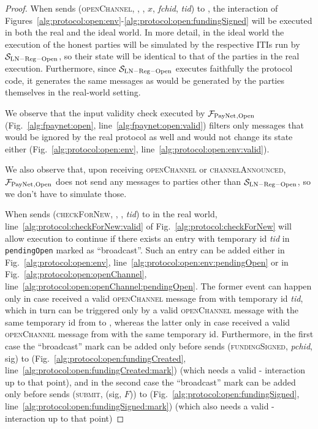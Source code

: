\begin{proof}
  When \environment{} sends (\textsc{openChannel}, \alice, \bob, $x$,
  \textit{fchid}, \textit{tid}) to \alice, the interaction of
  Figures~\ref{alg:protocol:open:env}-\ref{alg:protocol:open:fundingSigned}
  will be executed in both the real and the ideal world. In more detail, in
  the ideal world the execution of the honest parties will be simulated by the
  respective ITIs run by $\mathcal{S}_{\mathrm{LN - Reg - Open}}$, so their
  state will be identical to that of the parties in the real execution.
  Furthermore, since $\mathcal{S}_{\mathrm{LN - Reg - Open}}$ executes
  faithfully the protocol code, it generates the same messages as would be
  generated by the parties themselves in the real-world setting.

  We observe that the input validity check executed by $\mathcal{F}_{\mathrm{PayNet}}{}_{\mathrm{,
  Open}}$ (Fig.~\ref{alg:fpaynet:open}, line~\ref{alg:fpaynet:open:valid})
  filters only messages that would be ignored by the real protocol as well and
  would not change its state either (Fig.~\ref{alg:protocol:open:env},
  line~\ref{alg:protocol:open:env:valid}).

  We also observe that, upon receiving \textsc{openChannel} or
  \textsc{channelAnnounced}, $\mathcal{F}_{\mathrm{PayNet}}{}_{\mathrm{, Open}}$ does not send any
  messages to parties other than $\mathcal{S}_{\mathrm{LN - Reg - Open}}$, so
  we don't have to simulate those.

  When \environment{} sends (\textsc{checkForNew}, \alice, \bob, \textit{tid}) to
  \alice{} in the real world, line~\ref{alg:protocol:checkForNew:valid} of
  Fig.~\ref{alg:protocol:checkForNew} will allow execution to continue if there
  exists an entry with temporary id \textit{tid} in \texttt{pendingOpen}
  marked as ``broadcast''. Such an entry can be added either in
  Fig.~\ref{alg:protocol:open:env},
  line~\ref{alg:protocol:open:env:pendingOpen} or in
  Fig.~\ref{alg:protocol:open:openChannel},
  line~\ref{alg:protocol:open:openChannel:pendingOpen}. The former event can
  happen only in case \alice{} received a valid \textsc{openChannel} message
  from \bob{} with temporary id \textit{tid}, which in turn can be triggered
  only by a valid \textsc{openChannel} message with the same temporary id from
  \environment{} to \bob{}, whereas the latter only in case \alice{} received
  a valid \textsc{openChannel} message from \environment{} with the same
  temporary id. Furthermore, in the first case the ``broadcast'' mark can be
  added only before \alice{} sends (\textsc{fundingSigned}, \textit{pchid},
  sig) to \bob{} (Fig.~\ref{alg:protocol:open:fundingCreated},
  line~\ref{alg:protocol:open:fundingCreated:mark}) (which needs a valid
  \alice-\bob{} interaction up to that point), and in the second case the
  ``broadcast'' mark can be added only before \alice{} sends (\textsc{submit},
  (sig, $F$)) to \ledger{} (Fig.~\ref{alg:protocol:open:fundingSigned},
  line~\ref{alg:protocol:open:fundingSigned:mark}) (which also needs a valid
  \alice-\bob{} interaction up to that point)


\end{proof}
